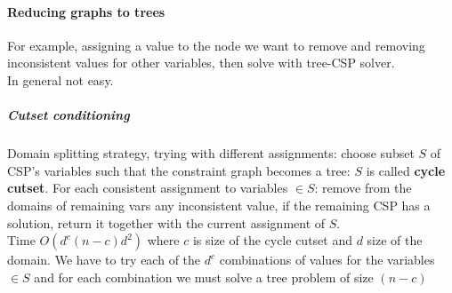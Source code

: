 \documentclass[10pt]{report}
\begin{document}
\paragraph{Reducing graphs to trees} For example, assigning a value to the node we want to remove and removing inconsistent values for other variables, then solve with tree-CSP solver.\\
In general not easy.
\subparagraph{Cutset conditioning} Domain splitting strategy, trying with different assignments: choose subset $S$ of CSP's variables such that the constraint graph becomes a tree: $S$ is called \textbf{cycle cutset}. For each consistent assignment to variables $\in S$: remove from the domains of remaining vars any inconsistent value, if the remaining CSP has a solution, return it together with the current assignment of $S$.\\
Time $O(d^c(n-c)d^2)$ where $c$ is size of the cycle cutset and $d$ size of the domain. We have to try each of the $d^c$ combinations of values for the variables $\in S$ and for each combination we must solve a tree problem of size $(n-c)$
\end{document}
